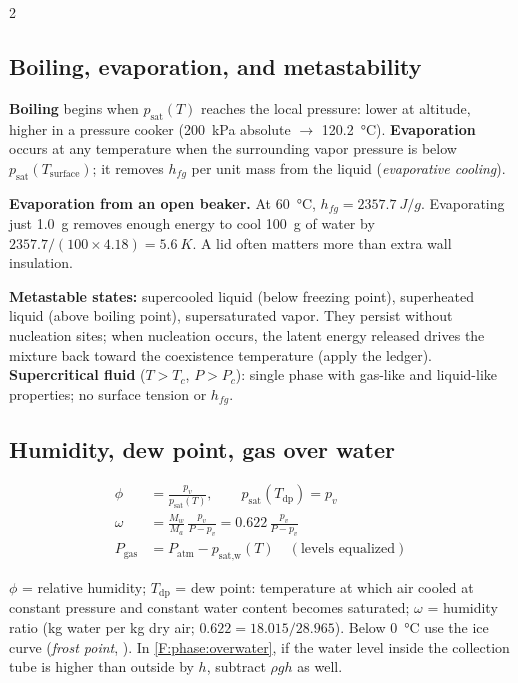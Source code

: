 \begin{multicols}{2}
\subsection{Boiling, evaporation, and metastability}\label{sec:boiling}
\textbf{Boiling} begins when $p_{\text{sat}}(T)$ reaches the local pressure: lower at altitude, higher in a pressure cooker (\SI{200}{kPa} absolute $\to$ \SI{120.2}{\celsius}). \textbf{Evaporation} occurs at any temperature when the surrounding vapor pressure is below $p_{\text{sat}}(T_{\text{surface}})$; it removes $h_{fg}$ per unit mass from the liquid (\emph{evaporative cooling}).

\begin{demobox}\textbf{Evaporation from an open beaker.} At \SI{60}{\celsius}, $h_{fg}=\SI{2357.7}{J/g}$. Evaporating just \SI{1.0}{g} removes enough energy to cool \SI{100}{g} of water by $2357.7/(100\times4.18)=\SI{5.6}{K}$. A lid often matters more than extra wall insulation.\end{demobox}

\textbf{Metastable states:} supercooled liquid (below freezing point), superheated liquid (above boiling point), supersaturated vapor. They persist without nucleation sites; when nucleation occurs, the latent energy released drives the mixture back toward the coexistence temperature (apply the ledger). \textbf{Supercritical fluid} ($T>T_c$, $P>P_c$): single phase with gas-like and liquid-like properties; no surface tension or $h_{fg}$.

\subsection{Humidity, dew point, gas over water}\label{sec:humidity}
\CORE{}
\begin{formulabox}
\vspace{-6pt}
\begin{align}
\phi &= \frac{p_v}{p_{\text{sat}}(T)},\qquad p_{\text{sat}}(T_{\text{dp}})=p_v \label{F:phase:RH}\\
\omega &= \frac{M_w}{M_a}\,\frac{p_v}{P-p_v}=0.622\,\frac{p_v}{P-p_v} \label{F:phase:omega}\\
P_{\text{gas}} &= P_{\text{atm}} - p_{\text{sat,w}}(T)\quad(\text{levels equalized}) \label{F:phase:overwater}
\end{align}
\end{formulabox}
$\phi$ = relative humidity; $T_{\text{dp}}$ = dew point: temperature at which air cooled at constant pressure and constant water content becomes saturated; $\omega$ = humidity ratio (kg water per kg dry air; $0.622=18.015/28.965$). Below \SI{0}{\celsius} use the ice curve (\emph{frost point}, ). In \eqref{F:phase:overwater}, if the water level inside the collection tube is higher than outside by $h$, subtract $\rho g h$ as well.


\end{multicols}
